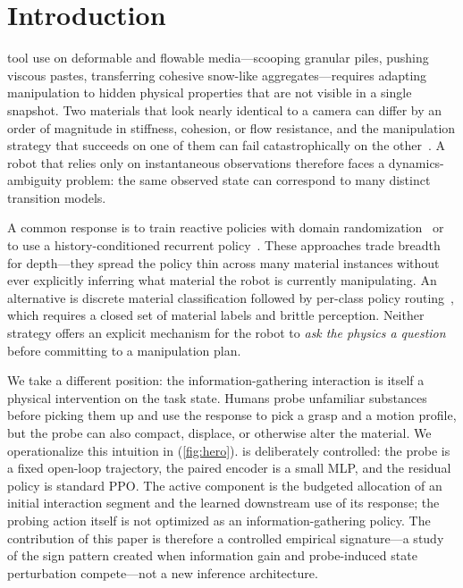 \section{Introduction}
\label{sec:introduction}

 tool use on deformable and flowable media---scooping granular piles, pushing viscous pastes, transferring cohesive snow-like aggregates---requires adapting manipulation to hidden physical properties that are not visible in a single snapshot. Two materials that look nearly identical to a camera can differ by an order of magnitude in stiffness, cohesion, or flow resistance, and the manipulation strategy that succeeds on one of them can fail catastrophically on the other~\cite{huang2022plasticinelab,lin2022diffskill,shi2023robocook}. A robot that relies only on instantaneous observations therefore faces a dynamics-ambiguity problem: the same observed state can correspond to many distinct transition models.

A common response is to train reactive policies with domain randomization~\cite{tobin2017domain,peng2018sim2real} or to use a history-conditioned recurrent policy~\cite{hausman2018learning,xie2018learning}. These approaches trade breadth for depth---they spread the policy thin across many material instances without ever explicitly inferring what material the robot is currently manipulating. An alternative is discrete material classification followed by per-class policy routing~\cite{calandra2018more}, which requires a closed set of material labels and brittle perception. Neither strategy offers an explicit mechanism for the robot to \emph{ask the physics a question} before committing to a manipulation plan.

We take a different position: the information-gathering interaction is itself a physical intervention on the task state. Humans probe unfamiliar substances before picking them up and use the response to pick a grasp and a motion profile, but the probe can also compact, displace, or otherwise alter the material. We operationalize this intuition in \PTA{} (\cref{fig:hero}). \PTA{} is deliberately controlled: the probe is a fixed open-loop trajectory, the paired encoder is a small MLP, and the residual policy is standard PPO. The active component is the budgeted allocation of an initial interaction segment and the learned downstream use of its response; the probing action itself is not optimized as an information-gathering policy. The contribution of this paper is therefore a controlled empirical signature---a study of the sign pattern created when information gain and probe-induced state perturbation compete---not a new inference architecture.


